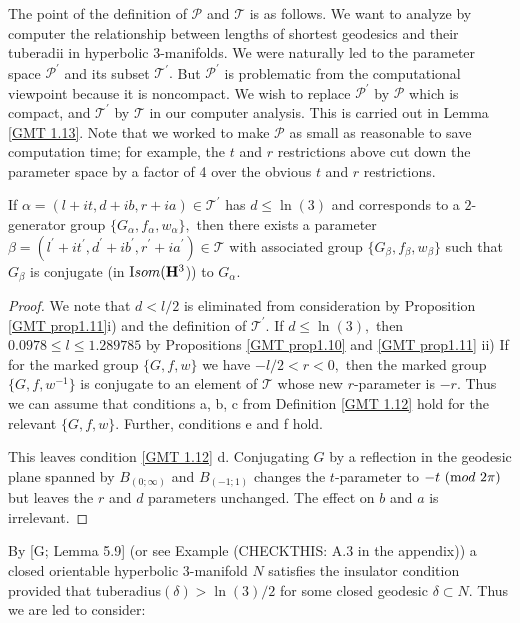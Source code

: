 The point of the definition of ${\mathcal P}$ and ${\mathcal T}$ is as follows.  We want to analyze by computer the relationship between lengths of shortest geodesics  and their tuberadii in hyperbolic $3$-manifolds.  We were naturally led to the parameter space 
${\mathcal P}^{\prime}$ and its subset ${\mathcal T}^{\prime}.$  But 
${\mathcal P}^{\prime}$ is problematic from the computational viewpoint because it is noncompact.  We wish to replace 
${\mathcal P}^{\prime}$ by ${\mathcal P}$ which is compact, and 
${\mathcal T}^{\prime}$ by ${\mathcal T}$ in our computer analysis.  This is carried out in Lemma \ref{GMT 1.13}.  Note that we worked to make ${\mathcal P}$ as small as reasonable to save computation time;  for example, the $t$ and $r$ restrictions above cut down the parameter space by a factor of 4 over the obvious $t$ and $r$ restrictions. 

\begin{lemma}\label{GMT 1.13}
If $\alpha=(l+it, d+ib, r+ia)\in {\mathcal T}^{\prime}$ has $d\le \ln(3)$ and
corresponds to a $2$\/{\textrm -}\/generator group
$\{G_\alpha,f_\alpha,w_\alpha\},$ then there exists a parameter $\beta=(l^{\prime}+it^{\prime}, d^{\prime}+ib^{\prime}, r^{\prime}+ia^{\prime})\in {\mathcal T}$ 
with associated group $\{G_\beta,f_\beta, w_\beta\}$ such that $G_\beta$ is conjugate (in ${\textrm Isom}({\mathbf H}^3$)) to $G_\alpha.$ 
\end{lemma}

\begin{proof} We note that $d < l/2$ is eliminated from consideration by
Proposition \ref{GMT prop1.11}i)
and the definition of ${\mathcal T}^\prime.$ If $d\le \ln(3),$
then
$0.0978\le l\le 1.289785$ by
Propositions \ref{GMT prop1.10} and \ref{GMT prop1.11} ii)
If for the marked group $\{G, f, w\}$ we have 
$-l/2<r<0,$ then the marked group
$\{G,f,w^{-1}\}$ is conjugate to an element of ${\mathcal T}$ whose new
$r$-parameter is $-r.$  Thus we can assume that
conditions a, b, c from Definition \ref{GMT 1.12} hold for the relevant $\{G,f,w\}.$  Further,    conditions e and f hold.

This leaves condition \ref{GMT 1.12} d.  Conjugating $G$ by a
reflection in the geodesic plane spanned
by $B_{(0;\infty)}$ and $B_{(-1;1)}$ changes the $t$-parameter to 
$-t \ ({\textrm mod}\ 2\pi)$
but leaves the $r$ and $d$ parameters unchanged.
The effect on $b$ and $a$ is irrelevant.  \end{proof}

By [G; Lemma 5.9] (or see
	Example (CHECKTHIS: A.3 in the appendix)) %
a closed orientable hyperbolic $3$-manifold $N$
satisfies the insulator condition provided that
tuberadius$(\delta) > \ln(3)/2$ for some closed geodesic $\delta\subset N.$  Thus we
are led to consider:

